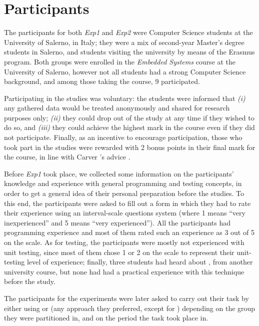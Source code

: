 \section{Participants}
The participants for both \textit{Exp1} and \textit{Exp2} were Computer Science students at the University of Salerno, in Italy; they were a mix of second-year Master's degree students in Salerno, and students visiting the university by means of the Erasmus program. Both groups were enrolled in the \textit{Embedded Systems} course at the University of Salerno, however not all students had a strong Computer Science background, and among those taking the course, 9 participated. 

Participating in the studies was voluntary: the students were informed that \textit{(i)} any gathered data would be treated anonymously and shared for research purposes only; \textit{(ii)} they could drop out of the study at any time if they wished to do so, and \textit{(iii)} they could achieve the highest mark in the course even if they did not participate. Finally, as an incentive to encourage participation, those who took part in the studies were rewarded with 2 bonus points in their final mark for the course, in line with Carver \etal's advice \cite{DBLP:conf/metrics/CarverJMS03}.

Before \textit{Exp1} took place, we collected some information on the participants' knowledge and experience with general programming and testing concepts, in order to get a general idea of their personal preparation before the studies. To this end, the participants were asked to fill out a form in which they had to rate their experience using an interval-scale questions system (where 1 means “very inexperienced” and 5 means “very experienced”). All the participants had programming experience and most of them rated such an experience as 3 out of 5 on the scale. 
As for testing, the participants were mostly not experienced with unit testing, since most of them chose 1 or 2 on the scale to represent their unit-testing level of experience; finally, three students had heard about \tdd, from another university course, but none had had a practical experience with this technique before the study.

The participants for the experiments were later asked to carry out their task by either using \tdd or \notdd (\ie any approach they preferred, except for \tdd) depending on the group they were partitioned in, and on the period the task took place in. 





